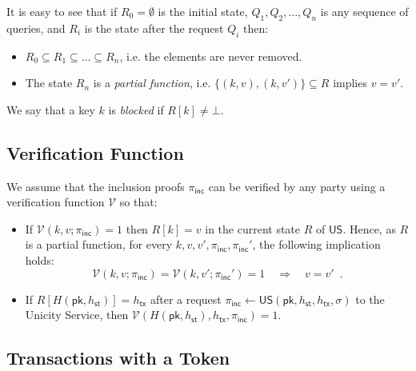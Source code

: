 \documentclass{article}
\newcommand{\pubkey}[0]{\mathsf{pk}}
\newcommand{\unisrv}[0]{\mathsf{US}}
\newcommand{\sthash}[0]{{h_\mathsf{st}}}
\newcommand{\txhash}[0]{{h_\mathsf{tx}}}
\newcommand{\univer}[0]{\mathcal{V}}
\newcommand{\pinc}[0]{{\pi_{\mathsf{inc}}}}
\begin{document}
\noindent It is easy to see that if $R_0 = \emptyset$ is the initial state, $Q_1, Q_2, \ldots, Q_n$ is any sequence of queries, and $R_i$ is the state after the request $Q_i$ then:
\begin{itemize}
\item $R_0 \subseteq R_1 \subseteq \ldots \subseteq R_n$, i.e. the elements are never removed.
\item The state $R_n$ is a \emph{partial function}, i.e.
$\{(k, v), (k, v')\} \subseteq R$ implies $v = v'$.
\end{itemize}

We say that a key $k$ is \emph{blocked} if $R[k] \neq \bot$.

\subsection{Verification Function}

We assume that the inclusion proofs $\pinc$ can be verified by any party using a verification function $\univer$ so that:
\begin{itemize}
\item If $\univer(k, v; \pinc) = 1$ then $R[k] = v$ in the current state $R$ of $\unisrv$. Hence, as $R$ is a partial function, for every $k, v, v', \pinc, \pinc'$, the following implication holds:
\begin{equation}\label{eq:eqtx}
\univer(k, v; \pinc) = \univer(k, v'; \pinc') = 1 \quad \Rightarrow \quad v =v' \enspace.
\end{equation}
\item If $R[H(\pubkey, \sthash)] = \txhash$ after a request $\pinc \gets \unisrv(\pubkey, \sthash, \txhash, \sigma)$ to the Unicity Service, then $\univer(H(\pubkey, \sthash), \txhash, \pinc) = 1$.
\end{itemize}

\subsection{Transactions with a Token}
\end{document}
